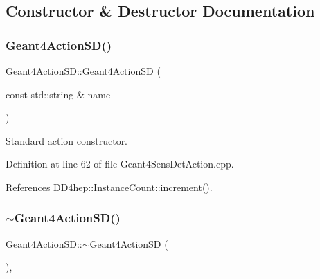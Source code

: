 \subsection{Constructor \& Destructor Documentation}
\hypertarget{class_d_d4hep_1_1_simulation_1_1_geant4_action_s_d_ad09cff29caa01d794981f342c0b1632e}{}\label{class_d_d4hep_1_1_simulation_1_1_geant4_action_s_d_ad09cff29caa01d794981f342c0b1632e} 
\subsubsection{\texorpdfstring{Geant4\+Action\+S\+D()}{Geant4ActionSD()}}
{\footnotesize\ttfamily Geant4\+Action\+S\+D\+::\+Geant4\+Action\+SD (\begin{DoxyParamCaption}\item[{const std\+::string \&}]{name }\end{DoxyParamCaption})\hspace{0.3cm}{\ttfamily [protected]}}



Standard action constructor. 



Definition at line 62 of file Geant4\+Sens\+Det\+Action.\+cpp.



References D\+D4hep\+::\+Instance\+Count\+::increment().

\hypertarget{class_d_d4hep_1_1_simulation_1_1_geant4_action_s_d_a535bbf839314d7cdaf37c42712ea96b6}{}\label{class_d_d4hep_1_1_simulation_1_1_geant4_action_s_d_a535bbf839314d7cdaf37c42712ea96b6} 
\subsubsection{\texorpdfstring{$\sim$\+Geant4\+Action\+S\+D()}{~Geant4ActionSD()}}
{\footnotesize\ttfamily Geant4\+Action\+S\+D\+::$\sim$\+Geant4\+Action\+SD (\begin{DoxyParamCaption}{ }\end{DoxyParamCaption})\hspace{0.3cm}{\ttfamily [protected]}, {\ttfamily [virtual]}}



